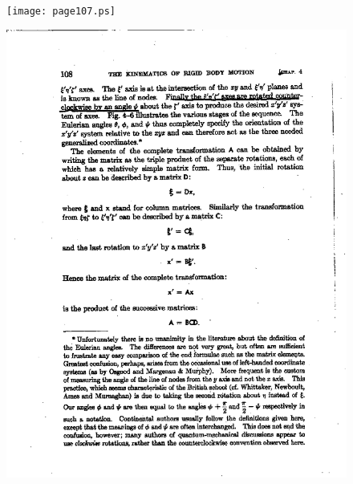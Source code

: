 \documentclass[11pt,preprint]{aastex}
\begin{document}
\begin{figure}
\texttt{[image: page107.ps]}
\end{figure}  

\begin{figure}
\includegraphics[width=7.0in] {page108.ps}
\end{figure}  
\end{document}
